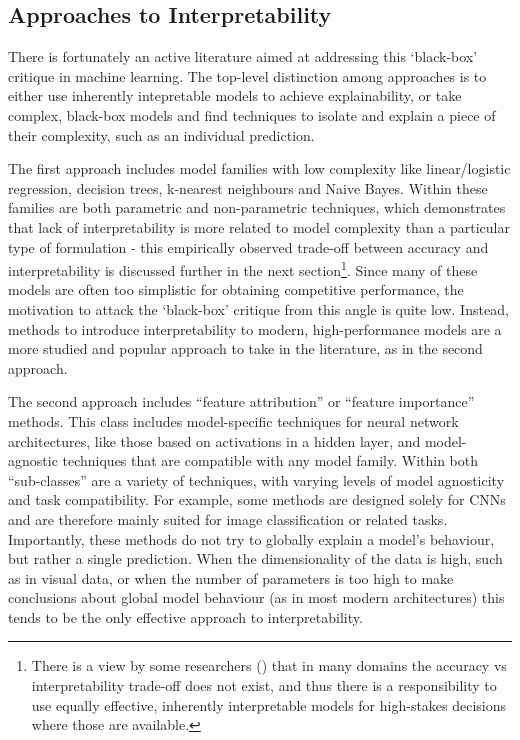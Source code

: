 \documentclass[main]{subfiles}
\begin{document}
\subsection*{Approaches to Interpretability}

There is fortunately an active literature aimed at addressing this `black-box' critique in machine learning. The top-level distinction among approaches is to either use inherently intepretable models to achieve explainability, or take complex, black-box models and find techniques to isolate and explain a piece of their complexity, such as an individual prediction.

The first approach includes model families with low complexity like linear/logistic regression, decision trees, k-nearest neighbours and Naive Bayes. Within these families are both parametric and non-parametric techniques, which demonstrates that lack of interpretability is more related to model complexity than a particular type of formulation - this empirically observed trade-off between accuracy and interpretability is discussed further in the next section\footnote{There is a view by some researchers (\cite{rudin}) that in many domains the accuracy vs interpretability trade-off does not exist, and thus there is a responsibility to use equally effective, inherently interpretable models for high-stakes decisions where those are available.}. Since many of these models are often too simplistic for obtaining competitive performance, the motivation to attack the `black-box' critique from this angle is quite low. Instead, methods to introduce interpretability to modern, high-performance models are a more studied and popular approach to take in the literature, as in the second approach.

The second approach includes ``feature attribution'' or ``feature importance'' methods. This class includes model-specific techniques for neural network architectures, like those based on activations in a hidden layer, and model-agnostic techniques that are compatible with any model family. Within both ``sub-classes'' are a variety of techniques, with varying levels of model agnosticity and task compatibility. For example, some methods are designed solely for CNNs and are therefore mainly suited for image classification or related tasks. Importantly, these methods do not try to globally explain a model's behaviour, but rather a single prediction. When the dimensionality of the data is high, such as in visual data, or when the number of parameters is too high to make conclusions about global model behaviour (as in most modern architectures) this tends to be the only effective approach to interpretability. 
\end{document}
